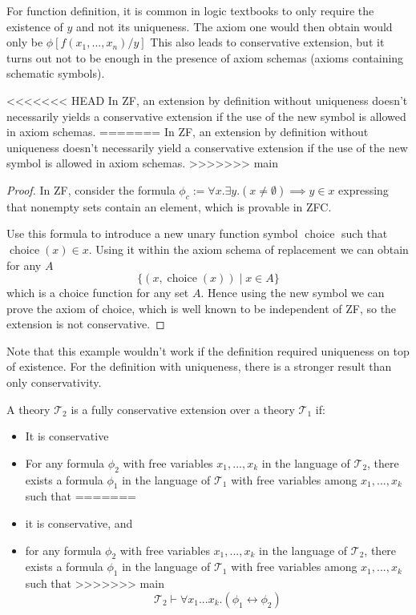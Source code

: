 For function definition, it is common in logic textbooks to only require the existence of $y$ and not its uniqueness. The axiom one would then obtain would only be $\phi[f(x_1,...,x_n)/y]$ This also leads to conservative extension, but it turns out not to be enough in the presence of axiom schemas (axioms containing schematic symbols).
\begin{lemma}
<<<<<<< HEAD
In ZF, an extension by definition without uniqueness doesn't necessarily yields a conservative extension if the use of the new symbol is allowed in axiom schemas.
=======
In ZF, an extension by definition without uniqueness doesn't necessarily yield a conservative extension if the use of the new symbol is allowed in axiom schemas.
>>>>>>> main
\end{lemma}
\begin{proof}
In ZF, consider the formula $\phi_c := \forall x. \exists y. (x \neq \emptyset) \implies y \in x$ expressing that nonempty sets contain an element, which is provable in ZFC.

Use this formula to introduce a new unary function symbol $\operatorname{choice}$ such that $\operatorname{choice}(x) \in x$. Using it within the axiom schema of replacement we can obtain for any $A$
$$
\lbrace (x, \operatorname{choice}(x)) \mid x \in A \rbrace
$$
which is a choice function for any set $A$. Hence using the new symbol we can prove the axiom of choice, which is well known to be independent of ZF, so the extension is not conservative.
\end{proof}
Note that this example wouldn't work if the definition required uniqueness on top of existence.
For the definition with uniqueness, there is a stronger result than only conservativity.
\begin{defin}
A theory $\mathcal{T}_2$ is a fully conservative extension over a theory $\mathcal{T}_1$ if:
\begin{itemize}
<<<<<<< HEAD
\item It is conservative
\item For any formula $\phi_2$ with free variables $x_1, ..., x_k$ in the language of $\mathcal{T}_2$, there exists a formula $\phi_1$ in the language of $\mathcal{T}_1$ with free variables among $x_1, ..., x_k$ such that
=======
\item it is conservative, and
\item for any formula $\phi_2$ with free variables $x_1, ..., x_k$ in the language of $\mathcal{T}_2$, there exists a formula $\phi_1$ in the language of $\mathcal{T}_1$ with free variables among $x_1, ..., x_k$ such that
>>>>>>> main
$$\mathcal{T}_2 \vdash \forall x_1...x_k. (\phi_1 \leftrightarrow \phi_2)$$
\end{itemize}
\end{defin}
